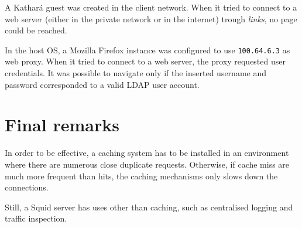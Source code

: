 \documentclass{homework}
\newcommand{\kat}{Kathará\xspace}
\newcommand{\sq}{Squid\xspace}
\begin{document}
    A \kat guest was created in the client network.
    When it tried to connect to a web server (either in the private network or in the internet) trough \textit{links}, no page could be reached.
    
    In the host OS, a Mozilla Firefox instance was configured to use \texttt{100.64.6.3} as web proxy.
    When it tried to connect to a web server, the proxy requested user credentials.
    It was possible to navigate only if the inserted username and password corresponded to a valid LDAP user account.
    
    
    \section{Final remarks}
    In order to be effective, a caching system has to be installed in an environment where there are numerous close duplicate requests.
    Otherwise, if cache miss are much more frequent than hits, the caching mechanisms only slows down the connections.
    
    Still, a \sq server has uses other than caching, such as centralised logging and traffic inspection.
\end{document}
